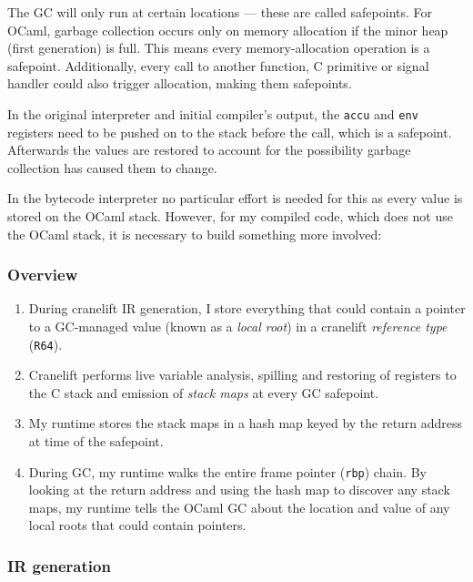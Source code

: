 The GC will only run at certain locations --- these are called safepoints. For OCaml,
garbage collection occurs only on memory allocation if the minor heap (first generation) is full.
This means every memory-allocation operation is a safepoint. Additionally, every call to another
function, C primitive or signal handler could also trigger allocation, making them safepoints.

In the original interpreter and initial compiler's output, the \texttt{accu} and \texttt{env}
registers
need to be pushed on to the stack before the call, which is a safepoint. Afterwards the values are
restored to account for the possibility garbage collection has caused them to change.

In the bytecode interpreter no particular effort is needed for this as every value is stored on the
OCaml stack. However, for my compiled code, which does not use the OCaml stack, it is necessary to
build something more involved:

\subsubsection{Overview}

\begin{enumerate}
      \item During cranelift IR generation, I store everything that could contain a pointer to a
            GC-managed value (known as a \emph{local root}) in a cranelift \emph{reference type}
            (\texttt{R64}).
      \item Cranelift performs live variable analysis, spilling and restoring of registers to the C
            stack and emission of \emph{stack maps} at every GC safepoint.
      \item My runtime stores the stack maps in a hash map keyed by the return address at time of
            the safepoint.
      \item During GC, my runtime walks the entire frame pointer (\texttt{rbp}) chain. By looking
            at the return address and using the hash map to discover any stack maps, my runtime
            tells the OCaml GC about the location and value of any local roots that could contain
            pointers.
\end{enumerate}

\subsubsection{IR generation} \label{gc-ir}

